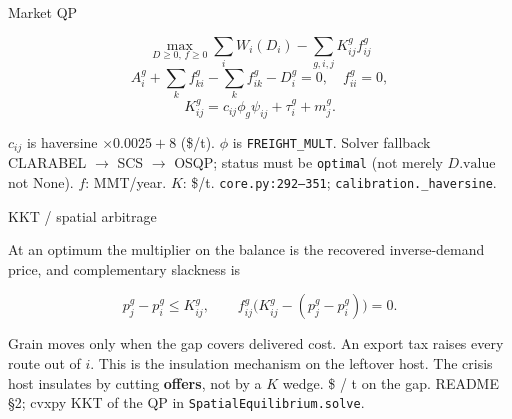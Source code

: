 \begin{frame}{Market QP}

\[
\max_{D\ge 0,\, f\ge 0}
\sum_i W_i(D_i) - \sum_{g,i,j} K^g_{ij} f^g_{ij}
\]
\[
A^g_i + \sum_k f^g_{ki} - \sum_k f^g_{ik} - D^g_i = 0,
\quad
f^g_{ii}=0,
\]
\[
K^g_{ij} = c_{ij}\phi_g\psi_{ij} + \tau^g_i + m^g_j.
\]

$c_{ij}$ is haversine $\times 0.0025 + 8$ (\$/t). $\phi$ is
\texttt{FREIGHT\_MULT}. Solver fallback CLARABEL $\to$ SCS $\to$ OSQP;
status must be \texttt{optimal} (not merely $D.\mathrm{value}$ not None).
{$f$: MMT/year. $K$: \$/t.}
{\texttt{core.py:292--351}; \texttt{calibration.\_haversine}.}
\end{frame}

\begin{frame}{KKT / spatial arbitrage}

At an optimum the multiplier on the balance is the recovered inverse-demand
price, and complementary slackness is

\[
p^g_j - p^g_i \le K^g_{ij},
\qquad
f^g_{ij}\bigl(K^g_{ij}-(p^g_j-p^g_i)\bigr)=0.
\]

Grain moves only when the gap covers delivered cost. An export tax raises
every route out of $i$. This is the insulation mechanism on the leftover
host. The crisis host insulates by cutting \textbf{offers}, not by a $K$ wedge.
{\$ / t on the gap.}
{README \S2; cvxpy KKT of the QP in \texttt{SpatialEquilibrium.solve}.}
\end{frame}

